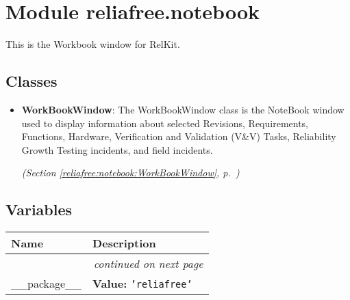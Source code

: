 %
%
%


\section{Module reliafree.notebook}

    \label{reliafree:notebook}
This is the Workbook window for RelKit.



\subsection{Classes}

\begin{itemize}  \setlength{\parskip}{0ex}
  \item \textbf{WorkBookWindow}: The WorkBookWindow class is the NoteBook window used to display information
about selected Revisions, Requirements, Functions, Hardware, Verification 
and Validation (V\&V) Tasks, Reliability Growth Testing incidents, and 
field incidents.



  \textit{(Section \ref{reliafree:notebook:WorkBookWindow}, p.~\pageref{reliafree:notebook:WorkBookWindow})}

\end{itemize}


  \subsection{Variables}

    \vspace{-1cm}
\hspace{\varindent}\begin{longtable}{|p{\varnamewidth}|p{\vardescrwidth}|l}
\cline{1-2}
\cline{1-2} \centering \textbf{Name} & \centering \textbf{Description}& \\
\cline{1-2}
\endhead\cline{1-2}\multicolumn{3}{r}{\small\textit{continued on next page}}\\\endfoot\cline{1-2}
\endlastfoot\raggedright \_\-\_\-p\-a\-c\-k\-a\-g\-e\-\_\-\_\- & \raggedright \textbf{Value:} 
{\tt \texttt{'}\texttt{reliafree}\texttt{'}}&\\
\cline{1-2}
\end{longtable}

